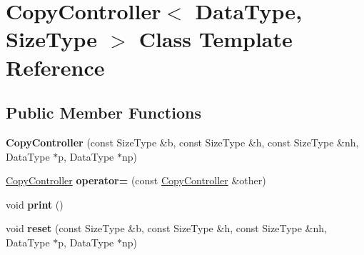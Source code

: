 \hypertarget{class_copy_controller}{
\section{CopyController$<$ DataType, SizeType $>$ Class Template Reference}
\label{class_copy_controller}
}
\subsection*{Public Member Functions}
\begin{DoxyCompactItemize}
\item 
\hypertarget{class_copy_controller_a6e340e34c98657f82046e08174b7a5ea}{
{\bfseries CopyController} (const SizeType \&b, const SizeType \&h, const SizeType \&nh, DataType $\ast$p, DataType $\ast$np)}
\label{class_copy_controller_a6e340e34c98657f82046e08174b7a5ea}

\item 
\hypertarget{class_copy_controller_a63945202157dab65b7891ecde172706d}{
\hyperlink{class_copy_controller}{CopyController} {\bfseries operator=} (const \hyperlink{class_copy_controller}{CopyController} \&other)}
\label{class_copy_controller_a63945202157dab65b7891ecde172706d}

\item 
\hypertarget{class_copy_controller_ad68d6cf3f241a6370f69a857c6be1e1d}{
void {\bfseries print} ()}
\label{class_copy_controller_ad68d6cf3f241a6370f69a857c6be1e1d}

\item 
\hypertarget{class_copy_controller_a827524d8fccaee8b8a925b28cd8780bc}{
void {\bfseries reset} (const SizeType \&b, const SizeType \&h, const SizeType \&nh, DataType $\ast$p, DataType $\ast$np)}
\label{class_copy_controller_a827524d8fccaee8b8a925b28cd8780bc}

\end{DoxyCompactItemize}
